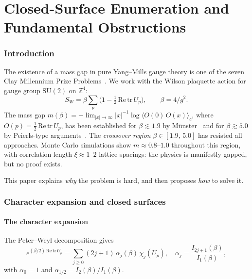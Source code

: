 \documentclass[12pt,a4paper]{article}
\newcommand{\Z}{\mathbb{Z}}
\newcommand{\half}{\tfrac{1}{2}}
\newcommand{\tr}{\mathrm{tr}}
\begin{document}

\part{Closed-Surface Enumeration and Fundamental Obstructions}

\section{Introduction}\label{sec:intro}

The existence of a mass gap in pure Yang--Mills gauge theory is one of the seven Clay Millennium Prize Problems~\cite{JaffeWitten}. We work with the Wilson plaquette action for gauge group $\mathrm{SU}(2)$ on $\Z^4$:
\begin{equation}\label{eq:wilson}
S_W = \beta\sum_{p}\bigl(1-\tfrac{1}{2}\,\mathrm{Re}\,\tr\, U_p\bigr), \qquad \beta = 4/g^2.
\end{equation}
The mass gap $m(\beta)=-\lim_{|x|\to\infty}|x|^{-1}\log\langle O(0)\,O(x)\rangle_c$, where $O(p)=\half\,\mathrm{Re}\,\tr\,U_p$, has been established for $\beta\lesssim 1.9$ by M\"unster~\cite{Munster1981} and for $\beta\gtrsim 5.0$ by Peierls-type arguments~\cite{Seiler1982}. The \emph{crossover region} $\beta\in[1.9,\,5.0]$ has resisted all approaches. Monte Carlo simulations show $m\approx 0.8$--$1.0$ throughout this region, with correlation length $\xi\approx 1$--$2$ lattice spacings: the physics is manifestly gapped, but no proof exists.

This paper explains \emph{why} the problem is hard, and then proposes \emph{how} to solve it.

\section{Character expansion and closed surfaces}\label{sec:character}

\subsection{The character expansion}

The Peter--Weyl decomposition gives
\begin{equation}\label{eq:char}
e^{(\beta/2)\,\mathrm{Re}\,\tr\, U_p} = \sum_{j\ge 0}(2j{+}1)\,\alpha_j(\beta)\,\chi_j(U_p), \quad \alpha_j = \frac{I_{2j+1}(\beta)}{I_1(\beta)},
\end{equation}
with $\alpha_0=1$ and $\alpha_{1/2}=I_2(\beta)/I_1(\beta)$.
\end{document}
